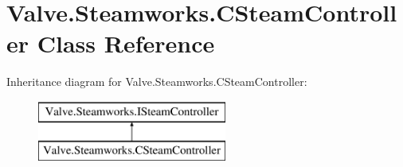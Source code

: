 \hypertarget{classValve_1_1Steamworks_1_1CSteamController}{}\section{Valve.\+Steamworks.\+C\+Steam\+Controller Class Reference}
\label{classValve_1_1Steamworks_1_1CSteamController}
Inheritance diagram for Valve.\+Steamworks.\+C\+Steam\+Controller\+:\begin{figure}[H]
\begin{center}
\leavevmode
\includegraphics[height=2.000000cm]{classValve_1_1Steamworks_1_1CSteamController}
\end{center}
\end{figure}
